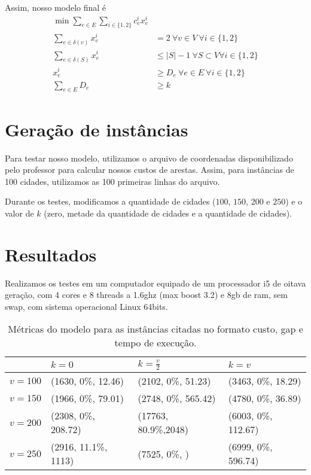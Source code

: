 \documentclass[11pt]{article}
\theoremstyle{definition}
\theoremstyle{definition}
\theoremstyle{remark}
\theoremstyle{remark}
\theoremstyle{remark}
\theoremstyle{remark}
\theoremstyle{definition}
\begin{document}
Assim, nosso modelo final é
\begin{align*}
\min \sum \limits_{e \in E} \sum \limits_{i \in \{1,2\}} c_{e}^{i} x_{e}^{i}& \\
\sum \limits_{e \in \delta(v)} x_{e}^{i} &= 2 \ \forall v \in V \ \forall i \in \{1,2\} \\
\sum \limits_{e \in \delta(S)} x_{e}^{i} &\leq |S| -1 \ \forall S \subset V \forall i \in \{1,2\} \\
x_{e}^{i} &\geq D_{e} \ \forall e \in E \ \forall i \in \{1,2\} \\
\sum \limits_{e \in E} D_{e} &\geq k
\end{align*}

\section*{Geração de instâncias}
\label{sec:org682535d}
Para testar nosso modelo, utilizamos o arquivo de coordenadas disponibilizado pelo professor para calcular nossos custos de arestas. Assim, para instâncias de 100 cidades, utilizamos as 100 primeiras linhas do arquivo.

Durante os testes, modificamos a quantidade de cidades (\(100\), \(150\), \(200\) e \(250\)) e o valor de \(k\) (zero, metade da quantidade de cidades e a quantidade de cidades).
\section*{Resultados}
\label{sec:org130df22}

Realizamos os testes em um computador equipado de um processador i5 de oitava geração, com 4 cores e 8 threads a 1.6ghz (max boost 3.2) e 8gb de ram, sem swap, com sistema operacional Linux 64bits. 


\begin{table}[htbp]
\caption{Métricas do modelo para as instâncias citadas no formato custo, gap e tempo de execução.}
\centering
\begin{tabular}{llll}
 & \(k=0\) & \(k=\frac{v}{2}\) & \(k = v\)\\
\hline
\(v = 100\) & (1630, 0\%, 12.46) & (2102, 0\%, 51.23) & (3463, 0\%, 18.29)\\
\(v = 150\) & (1966, 0\%, 79.01) & (2748, 0\%, 565.42) & (4780, 0\%, 36.89)\\
\(v = 200\) & (2308, 0\%, 208.72) & (17763, 80.9\%,2048) & (6003, 0\%, 112.67)\\
\(v = 250\) & (2916, 11.1\%, 1113) & (7525, 0\%, ) & (6999, 0\%, 596.74)\\
\end{tabular}
\end{table}
\end{document}
